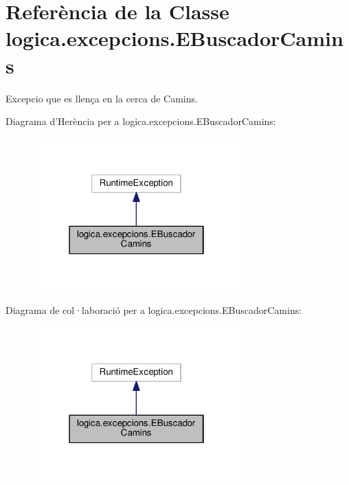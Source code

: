 \hypertarget{classlogica_1_1excepcions_1_1_e_buscador_camins}{\section{Referència de la Classe logica.\+excepcions.\+E\+Buscador\+Camins}
\label{classlogica_1_1excepcions_1_1_e_buscador_camins}
}


Excepcio que es llença en la cerca de Camins.  




Diagrama d'Herència per a logica.\+excepcions.\+E\+Buscador\+Camins\+:\nopagebreak
\begin{figure}[H]
\begin{center}
\leavevmode
\includegraphics[width=226pt]{classlogica_1_1excepcions_1_1_e_buscador_camins__inherit__graph}
\end{center}
\end{figure}


Diagrama de col·laboració per a logica.\+excepcions.\+E\+Buscador\+Camins\+:\nopagebreak
\begin{figure}[H]
\begin{center}
\leavevmode
\includegraphics[width=226pt]{classlogica_1_1excepcions_1_1_e_buscador_camins__coll__graph}
\end{center}
\end{figure}
